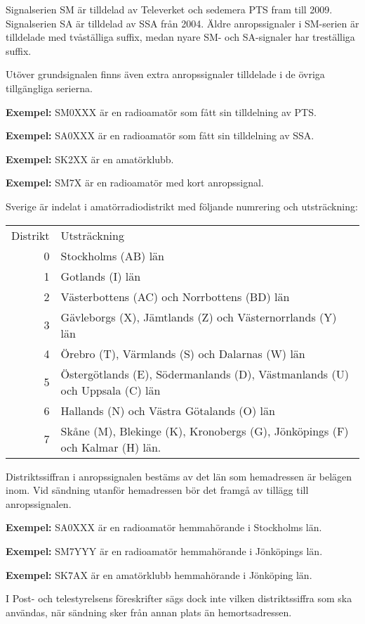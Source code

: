 Signalserien SM är tilldelad av Televerket och sedemera PTS fram till 2009.
Signalserien SA är tilldelad av SSA från 2004.
Äldre anropssignaler i SM-serien är tilldelade med tvåställiga suffix, medan nyare SM- och SA-signaler har treställiga suffix.

Utöver grundsignalen finns även extra anropssignaler tilldelade i de övriga tillgängliga serierna.

\textbf{Exempel:} SM0XXX är en radioamatör som fått sin tilldelning av PTS.

\textbf{Exempel:} SA0XXX är en radioamatör som fått sin tilldelning av SSA.

\textbf{Exempel:} SK2XX är en amatörklubb.

\textbf{Exempel:} SM7X är en radioamatör med kort anropssignal.

Sverige är indelat i amatörradiodistrikt med följande numrering och
utsträckning:

\begin{tabular}{rp{10cm}}
Distrikt & Utsträckning \\
0 & Stockholms (AB) län \\
1 & Gotlands (I) län \\
2 & Västerbottens (AC) och Norrbottens (BD) län \\
3 & Gävleborgs (X), Jämtlands (Z) och Västernorrlands (Y) län \\
4 & Örebro (T), Värmlands (S) och Dalarnas (W) län \\
5 & Östergötlands (E), Södermanlands (D), Västmanlands (U) och Uppsala (C) län\\
6 & Hallands (N) och Västra Götalands (O) län \\
7 & Skåne (M), Blekinge (K), Kronobergs (G), Jönköpings (F) och Kalmar (H) län.\\
\end{tabular}

Distriktssiffran i anropssignalen bestäms av det län som hemadressen är belägen inom.
Vid sändning utanför hemadressen bör det framgå av tillägg till anropssignalen.

\textbf{Exempel:} SA0XXX är en radioamatör hemmahörande i Stockholms län.

\textbf{Exempel:} SM7YYY är en radioamatör hemmahörande i Jönköpings län.

\textbf{Exempel:} SK7AX är en amatörklubb hemmahörande i Jönköping län.

I Post- och telestyrelsens föreskrifter sägs dock inte vilken distriktssiffra
som ska användas, när sändning sker från annan plats än hemortsadressen.

